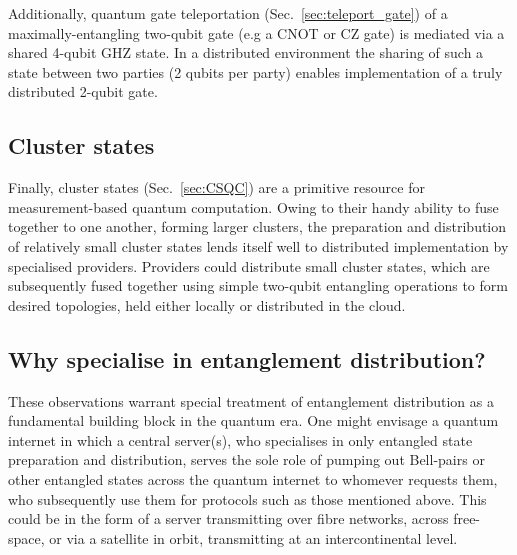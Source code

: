Additionally, quantum gate teleportation (Sec.~\ref{sec:teleport_gate}) of a maximally-entangling two-qubit gate (e.g a CNOT or CZ gate) is mediated via a shared 4-qubit GHZ state. In a distributed environment the sharing of such a state between two parties (2 qubits per party) enables implementation of a truly distributed 2-qubit gate.


%
%

\subsection{Cluster states}

Finally, cluster states (Sec.~\ref{sec:CSQC}) are a primitive resource for measurement-based quantum computation. Owing to their handy ability to fuse together to one another, forming larger clusters, the preparation and distribution of relatively small cluster states lends itself well to distributed implementation by specialised providers. Providers could distribute small cluster states, which are subsequently fused together using simple two-qubit entangling operations to form desired topologies, held either locally or distributed in the cloud.

%
%

\subsection{Why specialise in entanglement distribution?}

These observations warrant special treatment of entanglement distribution as a fundamental building block in the quantum era. One might envisage a quantum internet in which a central server(s), who specialises in only entangled state preparation and distribution, serves the sole role of pumping out Bell-pairs or other entangled states across the quantum internet to whomever requests them, who subsequently use them for protocols such as those mentioned above. This could be in the form of a server transmitting over fibre networks, across free-space, or via a satellite in orbit, transmitting at an intercontinental level.

